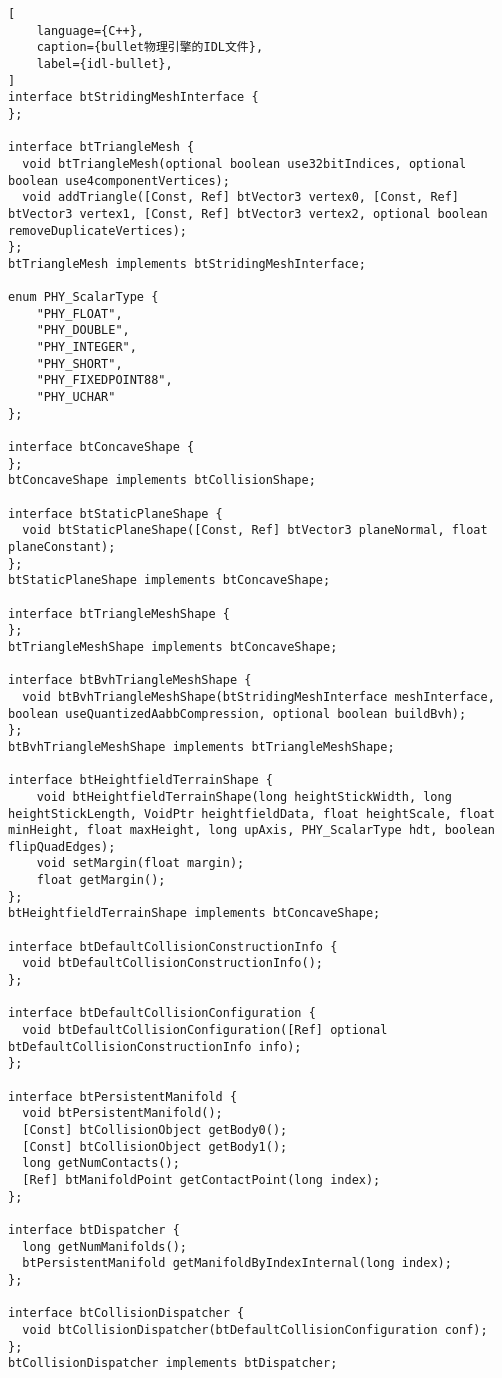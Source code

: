 \begin{lstlisting}[
    language={C++},
    caption={bullet物理引擎的IDL文件},
    label={idl-bullet},
]
interface btStridingMeshInterface {
};

interface btTriangleMesh {
  void btTriangleMesh(optional boolean use32bitIndices, optional boolean use4componentVertices);
  void addTriangle([Const, Ref] btVector3 vertex0, [Const, Ref] btVector3 vertex1, [Const, Ref] btVector3 vertex2, optional boolean removeDuplicateVertices);
};
btTriangleMesh implements btStridingMeshInterface;

enum PHY_ScalarType {
    "PHY_FLOAT",
    "PHY_DOUBLE",
    "PHY_INTEGER",
    "PHY_SHORT",
    "PHY_FIXEDPOINT88",
    "PHY_UCHAR"
};

interface btConcaveShape {
};
btConcaveShape implements btCollisionShape;

interface btStaticPlaneShape {
  void btStaticPlaneShape([Const, Ref] btVector3 planeNormal, float planeConstant);
};
btStaticPlaneShape implements btConcaveShape;

interface btTriangleMeshShape {
};
btTriangleMeshShape implements btConcaveShape;

interface btBvhTriangleMeshShape {
  void btBvhTriangleMeshShape(btStridingMeshInterface meshInterface, boolean useQuantizedAabbCompression, optional boolean buildBvh);
};
btBvhTriangleMeshShape implements btTriangleMeshShape;

interface btHeightfieldTerrainShape {
    void btHeightfieldTerrainShape(long heightStickWidth, long heightStickLength, VoidPtr heightfieldData, float heightScale, float minHeight, float maxHeight, long upAxis, PHY_ScalarType hdt, boolean flipQuadEdges);
    void setMargin(float margin);
    float getMargin();
};
btHeightfieldTerrainShape implements btConcaveShape;

interface btDefaultCollisionConstructionInfo {
  void btDefaultCollisionConstructionInfo();
};

interface btDefaultCollisionConfiguration {
  void btDefaultCollisionConfiguration([Ref] optional btDefaultCollisionConstructionInfo info);
};

interface btPersistentManifold {
  void btPersistentManifold();
  [Const] btCollisionObject getBody0();
  [Const] btCollisionObject getBody1();
  long getNumContacts();
  [Ref] btManifoldPoint getContactPoint(long index);
};

interface btDispatcher {
  long getNumManifolds();
  btPersistentManifold getManifoldByIndexInternal(long index);
};

interface btCollisionDispatcher {
  void btCollisionDispatcher(btDefaultCollisionConfiguration conf);
};
btCollisionDispatcher implements btDispatcher;


\end{lstlisting}
